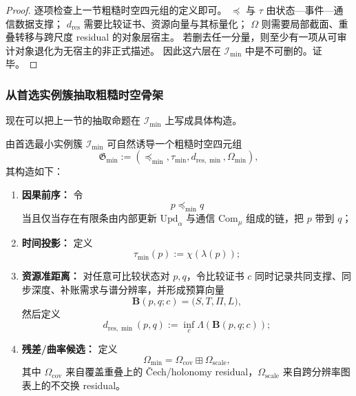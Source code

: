 \begin{proof}
逐项检查上一节粗糙时空四元组的定义即可。
\(\preceq\) 与 \(\tau\) 由状态—事件—通信数据支撑；
\(d_{\mathrm{res}}\) 需要比较证书、资源向量与其标量化；
\(\Omega\) 则需要局部截面、重叠转移与跨尺度 residual 的对象层宿主。
若删去任一分量，则至少有一项从可审计对象退化为无宿主的非正式描述。
因此这六层在 \(\mathcal I_{\min}\) 中是不可删的。证毕。
\end{proof}

\subsubsection{从首选实例簇抽取粗糙时空骨架}\label{subsubsec:typed-address-biaxial-completion-preferred-minimal-instantiation-extraction}
现在可以把上一节的抽取命题在 \(\mathcal I_{\min}\) 上写成具体构造。

\begin{theorem}[首选最小实例簇的粗糙时空抽取]\label{thm:typed-address-biaxial-completion-preferred-minimal-instantiation-extraction}
由首选最小实例簇 \(\mathcal I_{\min}\) 可自然诱导一个粗糙时空四元组
\[
\mathfrak G_{\min}
:=
(\preceq_{\min},\tau_{\min},d_{\mathrm{res},\min},\Omega_{\min}),
\]
其构造如下：
\begin{enumerate}
  \item \textbf{因果前序：}
  令
  \[
  p\preceq_{\min} q
  \]
  当且仅当存在有限条由内部更新 \(\mathrm{Upd}_\alpha\) 与通信 \(\mathrm{Com}_\mu\) 组成的链，把 \(p\) 带到 \(q\)；
  \item \textbf{时间投影：}
  定义
  \[
  \tau_{\min}(p):=\chi(\lambda(p));
  \]
  \item \textbf{资源准距离：}
  对任意可比较状态对 \(p,q\)，令比较证书 \(c\) 同时记录共同支撑、同步深度、补账需求与谱分辨率，并形成预算向量
  \[
  \mathbf B(p,q;c)=\bigl(S,T,\Pi,L\bigr),
  \]
  然后定义
  \[
  d_{\mathrm{res},\min}(p,q):=\inf_c\Lambda(\mathbf B(p,q;c));
  \]
  \item \textbf{残差/曲率候选：}
  定义
  \[
  \Omega_{\min}=\Omega_{\mathrm{cov}}\boxplus \Omega_{\mathrm{scale}},
  \]
  其中 \(\Omega_{\mathrm{cov}}\) 来自覆盖重叠上的 Čech/holonomy residual，\(\Omega_{\mathrm{scale}}\) 来自跨分辨率图表上的不交换 residual。
\end{enumerate}
\end{theorem}

